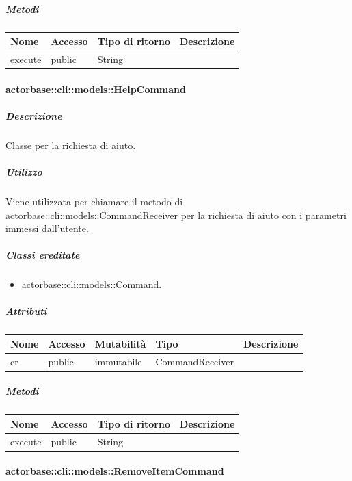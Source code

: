 \documentclass{scalatekids-article}
\begin{document}
\subparagraph{Metodi}

\begin{tabular}{| l | l | l | l |}
  \hline
  Nome & Accesso & Tipo di ritorno & Descrizione\\
  \hline
  execute & public & String & \\
  \hline
\end{tabular}

\paragraph{actorbase::cli::models::HelpCommand}
\label{sec:actorbase::cli::models::HelpCommand}

\subparagraph{Descrizione}

Classe per la richiesta di aiuto.

\subparagraph{Utilizzo}

Viene utilizzata per chiamare il metodo di
actorbase::cli::models::CommandReceiver per la richiesta di aiuto con i
parametri immessi dall'utente.

\subparagraph{Classi ereditate}

\begin{itemize}
\item \hyperref[sec:actorbase::cli::models::Command]{actorbase::cli::models::Command}.
\end{itemize}

\subparagraph{Attributi}

\begin{tabular}{| l | l | l | l | l |}
  \hline
  Nome & Accesso & Mutabilità & Tipo & Descrizione\\
  \hline
  cr & public & immutabile & CommandReceiver & \\
  \hline
\end{tabular}

\subparagraph{Metodi}

\begin{tabular}{| l | l | l | l |}
  \hline
  Nome & Accesso & Tipo di ritorno & Descrizione\\
  \hline
  execute & public & String & \\
  \hline
\end{tabular}

\paragraph{actorbase::cli::models::RemoveItemCommand}
\label{sec:actorbase::cli::models::RemoveItemCommand}
\end{document}
